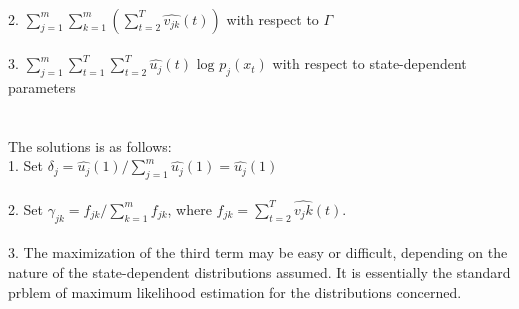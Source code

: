 \documentclass{article}
\begin{document}
\\
2. $\sum_{j=1}^m \sum_{k=1}^m (\sum_{t=2}^T \hat{v_{jk}} (t))$ with respect to $\Gamma$ \\
\\
3. $\sum_{j=1}^m \sum_{t=1}^T \sum_{t=2}^T \hat{u_{j}}(t) \text{ log } p_j(x_t)$ with respect to state-dependent parameters \\
\\
\\
The solutions is as follows: \\
1. Set $\delta_j = \hat{u_j}(1) / \sum_{j=1}^m \hat{u_j}(1) = \hat{u_j}(1)$ \\
\\
2. Set $\gamma_{jk} = f_{jk} / \sum_{k=1}^m f_{jk}$, where $f_{jk} = \sum_{t=2}^T \hat{v_jk}(t)$. \\
\\
3. The maximization of the third term may be easy or difficult, depending on the nature of the state-dependent distributions assumed. It is essentially the standard prblem of maximum likelihood estimation for the distributions concerned.
\end{document}
